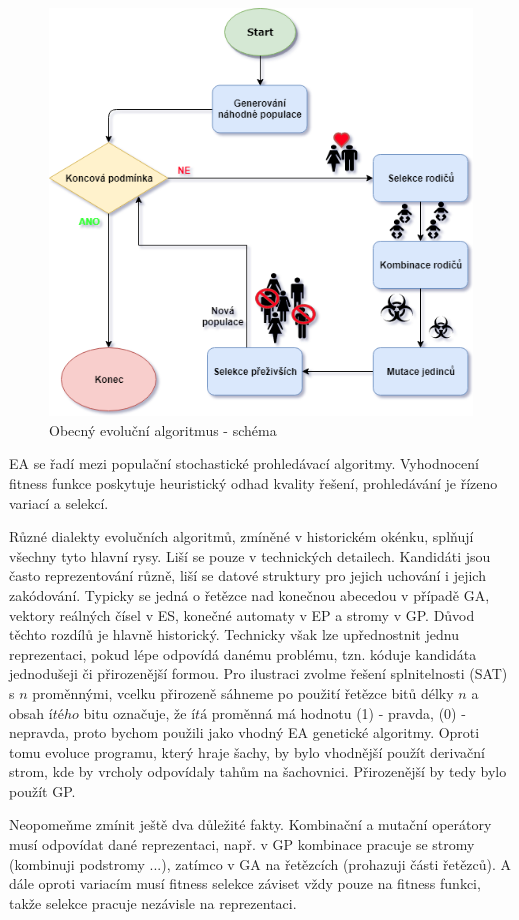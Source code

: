 \begin{figure}[h]\centering
\includegraphics[scale=0.64]{../img/EA.png}
\caption{Obecný evoluční algoritmus - schéma}
\end{figure}
EA se řadí mezi populační stochastické prohledávací	algoritmy. Vyhodnocení fitness funkce poskytuje heuristický odhad kvality řešení, prohledávání je řízeno variací a selekcí. \par
Různé dialekty evolučních algoritmů, zmíněné v historickém okénku, splňují všechny tyto hlavní rysy. Liší se pouze v technických detailech. Kandidáti jsou často reprezentování různě, liší se datové struktury pro jejich uchování i jejich zakódování. Typicky se jedná o řetězce nad konečnou abecedou v případě GA, vektory reálných čísel v ES, konečné automaty v EP a stromy v GP. Důvod těchto rozdílů je hlavně historický. Technicky však lze upřednostnit jednu reprezentaci, pokud lépe odpovídá danému problému, tzn. kóduje kandidáta jednodušeji či přirozenější formou. Pro ilustraci zvolme řešení splnitelnosti (SAT) s $n$ proměnnými, vcelku přirozeně sáhneme po použití řetězce bitů délky $n$ a obsah $ítého$ bitu označuje, že $ítá$ proměnná má hodnotu (1) - pravda, (0) - nepravda, proto bychom použili jako vhodný EA genetické algoritmy. Oproti tomu evoluce programu, který hraje šachy, by bylo vhodnější použít derivační strom, kde by vrcholy odpovídaly tahům na šachovnici. Přirozenější by tedy bylo použít GP. \par
Neopomeňme zmínit ještě dva důležité fakty. Kombinační a mutační operátory musí odpovídat dané reprezentaci, např. v GP kombinace pracuje se stromy (kombinuji podstromy ...), zatímco v GA na řetězcích (prohazuji části řetězců). A dále oproti variacím musí fitness selekce záviset vždy pouze na fitness funkci, takže selekce pracuje nezávisle na reprezentaci.
